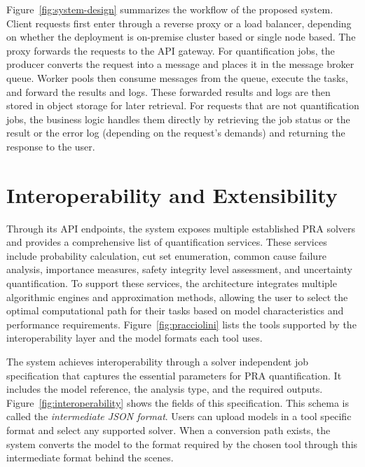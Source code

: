 Figure~\ref{fig:system-design} summarizes the workflow of the proposed system. Client requests first enter through a reverse proxy or a load balancer, depending on whether the deployment is on-premise cluster based or single node based. The proxy forwards the requests to the API gateway. For quantification jobs, the producer converts the request into a message and places it in the message broker queue. Worker pools then consume messages from the queue, execute the tasks, and forward the results and logs. These forwarded results and logs are then stored in object storage for later retrieval. For requests that are not quantification jobs, the business logic handles them directly by retrieving the job status or the result or the error log (depending on the request's demands) and returning the response to the user.



%

\section{Interoperability and Extensibility}
Through its API endpoints, the system exposes multiple established PRA solvers and provides a comprehensive list of quantification services. These services include probability calculation, cut set enumeration, common cause failure analysis, importance measures, safety integrity level assessment, and uncertainty quantification. To support these services, the architecture integrates multiple algorithmic engines and approximation methods, allowing the user to select the optimal computational path for their tasks based on model characteristics and performance requirements. Figure~\ref{fig:pracciolini} lists the tools supported by the interoperability layer and the model formats each tool uses.



The system achieves interoperability through a solver independent job specification that captures the essential parameters for PRA quantification. It includes the model reference, the analysis type, and the required outputs. Figure~\ref{fig:interoperability} shows the fields of this specification. This schema is called the \emph{intermediate JSON format}. Users can upload models in a tool specific format and select any supported solver. When a conversion path exists, the system converts the model to the format required by the chosen tool through this intermediate format behind the scenes.

